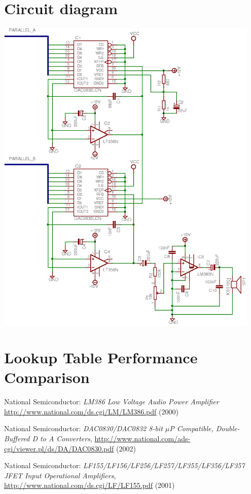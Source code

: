\documentclass[10pt,twoside,openright]{report}
\newenvironment{nowordcount}{}{}
\begin{document}
\begin{nowordcount}

\chapter{Circuit diagram}
\begin{center}
\label{appendix:circuit_diagram}
\includegraphics[width=0.95\textwidth]{images/output-schematic}
\end{center}

\chapter{Lookup Table Performance Comparison}
\label{appendix:lookup-table-comparison}


\pagebreak
\begin{thebibliography}{99}

National Semiconductor:
\emph{LM386 Low Voltage Audio Power Amplifier}
\url{http://www.national.com/ds.cgi/LM/LM386.pdf} (2000)

National Semiconductor:
\emph{DAC0830/DAC0832 8-bit $\mu$P Compatible, Double-Buffered D to A Converters}, 
\url{http://www.national.com/ads-cgi/viewer.pl/ds/DA/DAC0830.pdf} (2002)

National Semiconductor:
\emph{LF155/LF156/LF256/LF257/LF355/LF356/LF357 JFET Input Operational Amplifiers},
\url{http://www.national.com/ds.cgi/LF/LF155.pdf} (2001)
\end{thebibliography}

\end{nowordcount}
\end{document}
